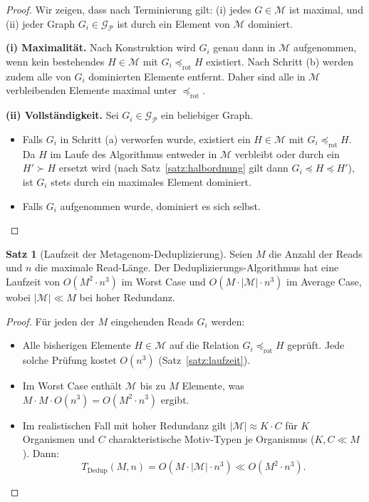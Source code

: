 ﻿\documentclass[a4paper,12pt]{article}
\theoremstyle{definition}
\newtheorem{satz}{Satz}
\begin{document}
\begin{proof}
	Wir zeigen, dass nach Terminierung gilt:
	(i) jedes $G \in \mathcal{M}$ ist maximal, und
	(ii) jeder Graph $G_i \in \mathcal{G}_{\mathcal{P}}$ ist durch ein
	Element von $\mathcal{M}$ dominiert.
	
	\textbf{(i) Maximalität.}
	Nach Konstruktion wird $G_i$ genau dann in $\mathcal{M}$ aufgenommen,
	wenn kein bestehendes $H \in \mathcal{M}$ mit $G_i \preceq_{\mathrm{rot}} H$
	existiert. Nach Schritt (b) werden zudem alle von $G_i$ dominierten
	Elemente entfernt. Daher sind alle in $\mathcal{M}$ verbleibenden Elemente
	maximal unter $\preceq_{\mathrm{rot}}$.
	
	\textbf{(ii) Vollständigkeit.}
	Sei $G_i \in \mathcal{G}_{\mathcal{P}}$ ein beliebiger Graph.
	\begin{itemize}
		\item Falls $G_i$ in Schritt (a) verworfen wurde, existiert ein
		$H \in \mathcal{M}$ mit $G_i \preceq_{\mathrm{rot}} H$.
		Da $H$ im Laufe des Algorithmus entweder in $\mathcal{M}$
		verbleibt oder durch ein $H' \succ H$ ersetzt wird
		(nach Satz~\ref{satz:halbordnung} gilt dann
		$G_i \preceq H \preceq H'$), ist $G_i$ stets durch ein
		maximales Element dominiert.
		\item Falls $G_i$ aufgenommen wurde, dominiert es sich selbst. 
	\end{itemize}
\end{proof}

\begin{satz}[Laufzeit der Metagenom-Deduplizierung]
	\label{satz:dedup_laufzeit}
	Seien $M$ die Anzahl der Reads und $n$ die maximale Read-Länge.
	Der Deduplizierungs-Algorithmus hat eine Laufzeit von
	$O(M^2 \cdot n^3)$ im Worst Case und $O(M \cdot |\mathcal{M}| \cdot n^3)$
	im Average Case, wobei $|\mathcal{M}| \ll M$ bei hoher Redundanz.
\end{satz}

\begin{proof}
	Für jeden der $M$ eingehenden Reads $G_i$ werden:
	\begin{itemize}
		\item Alle bisherigen Elemente $H \in \mathcal{M}$ auf die Relation
		$G_i \preceq_{\mathrm{rot}} H$ geprüft. Jede solche Prüfung
		kostet $O(n^3)$ (Satz~\ref{satz:laufzeit}).
		\item Im Worst Case enthält $\mathcal{M}$ bis zu $M$ Elemente, was
		$M \cdot M \cdot O(n^3) = O(M^2 \cdot n^3)$ ergibt.
		\item Im realistischen Fall mit hoher Redundanz gilt $|\mathcal{M}|
		\approx K \cdot C$ für $K$ Organismen und $C$ charakteristische
		Motiv-Typen je Organismus ($K, C \ll M$). Dann:
		\[
		T_{\text{Dedup}}(M, n) = O(M \cdot |\mathcal{M}| \cdot n^3)
		\ll O(M^2 \cdot n^3).
		\]
	\end{itemize}
\end{proof}
\end{document}
